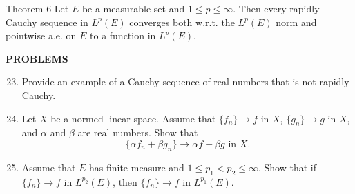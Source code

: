 \begin{namedthm*}{Theorem 6}
	Let $E$ be a measurable set and $1\le p\le\infty$.
	Then every rapidly Cauchy sequence in $L^p(E)$ converges both w.r.t. the $L^p(E)$ norm and pointwise a.e. on $E$ to a function in $L^p(E)$.
\end{namedthm*}

\begin{center}
	\textbf{PROBLEMS}
\end{center}
\begin{enumerate}
	\setcounter{enumi}{22}
	\item Provide an example of a Cauchy sequence of real numbers that is not rapidly Cauchy.
	\item Let $X$ be a normed linear space.
	Assume that $\{f_n\}\to f$ in $X$, $\{g_n\}\to g$ in $X$, and $\alpha$ and $\beta$ are real numbers.
	Show that
	\[
		\{\alpha f_n+\beta g_n\}\to\alpha f+\beta g\text{ in }X.
	\]
	\item Assume that $E$ has finite measure and $1\le p_1< p_2\le\infty$.
	Show that if $\{f_n\}\to f$ in $L^{p_2}(E)$, then $\{f_n\}\to f$ in $L^{p_1}(E)$.
	

\end{enumerate}
